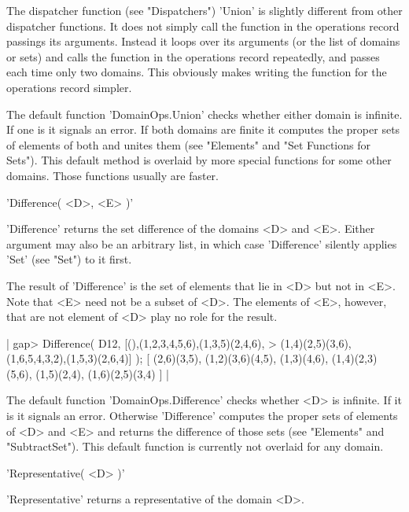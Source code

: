 The dispatcher function (see "Dispatchers") 'Union' is slightly different
from other dispatcher functions.  It does not simply call the function in
the operations record passings its arguments.  Instead it loops over  its
arguments (or the list of domains or sets) and calls the function  in the
operations  record repeatedly,  and  passes each  time only two  domains.
This  obviously makes  writing  the function  for  the  operations record
simpler.

The default function 'DomainOps.Union'  checks  whether either domain  is
infinite.  If one is it signals  an error.  If both domains are finite it
computes  the  proper sets  of  elements  of both and  unites  them  (see
"Elements"  and  "Set Functions  for  Sets").   This  default  method  is
overlaid  by  more special  functions  for  some  other  domains.   Those
functions usually are faster.

%

'Difference( <D>, <E> )'

'Difference'  returns the  set difference  of  the domains  <D> and  <E>.
Either argument may also be an arbitrary list, in which case 'Difference'
silently applies 'Set' (see "Set") to it first.

The result of 'Difference' is the set of elements that lie in <D> but not
in <E>.  Note that <E> need not be a subset of <D>.  The elements of <E>,
however, that are not element of <D> play no role for the result.

|    gap> Difference( D12, [(),(1,2,3,4,5,6),(1,3,5)(2,4,6),
    >                    (1,4)(2,5)(3,6),(1,6,5,4,3,2),(1,5,3)(2,6,4)] );
    [ (2,6)(3,5), (1,2)(3,6)(4,5), (1,3)(4,6), (1,4)(2,3)(5,6),
      (1,5)(2,4), (1,6)(2,5)(3,4) ] |

The  default  function  'DomainOps.Difference'  checks  whether  <D>   is
infinite.  If it is it signals an error.  Otherwise 'Difference' computes
the  proper sets of elements of <D> and <E> and returns the difference of
those  sets (see "Elements" and "SubtractSet").  This default function is
currently not overlaid for any domain.


'Representative( <D> )'

'Representative' returns a representative of the domain <D>.


